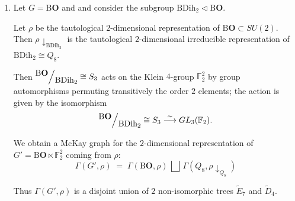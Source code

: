 \documentclass[ALCO]{cedram}
\def\quotient#1#2{
    \raise1ex\hbox{$#1$}\Big/\lower1ex\hbox{$#2$}
}
\begin{document}
\begin{exam}
\begin{enumerate}
 Let $\rho$ be the tautological $2$-dimensional representation of $\mathrm{B}\mathbf{O}\subset SU(2)$. Then $\rho\downarrow_{\mathrm{B}\mathbf{T}}$ is the tautological $2$-dimensional irreducible representation of~$\mathrm{B}\mathbf{T}$.
 
We obtain a McKay graph for the $2$-dimensional representation of $G'=\mathrm{B}\mathbf{O} \ltimes {C_3}$ coming from $\rho$: $$\Gamma(G', \rho) \;=\; \Gamma(\mathrm{B}\mathbf{O}, \rho) \,\bigsqcup \,\Gamma(\mathrm{B}\mathbf{T}, \rho\downarrow_{\mathrm{B}\mathbf{T}})$$
 
 Thus $\Gamma(G',  \rho)$ is a disjoint union of $2$ non-isomorphic trees $\widetilde{E}_7$ and $\widetilde{E}_6$.
   \item Let $G=\mathrm{B}\mathbf{O}$ and 
   and consider the subgroup $\mathrm{BDih}_2 \triangleleft \mathrm{B}\mathbf{O}$.
   
   Let $\rho$ be the {tautological} $2$-dimensional representation of $\mathrm{B}\mathbf{O}\subset SU(2)$. Then $\rho\downarrow_{\mathrm{BDih}_2}$ is the tautological $2$-dimensional irreducible representation of $\mathrm{BDih}_2 \cong Q_8 $.
 
   
  Then $\quotient{\mathrm{B}\mathbf{O}}{\mathrm{BDih}_2}  \cong S_3$ acts on the Klein $4$-group $\mathbb{F}_2^2$ by group automorphisms permuting transitively the order $2$ elements; the action is given by the isomorphism $$\quotient{\mathrm{B}\mathbf{O}}{\mathrm{BDih}_2} \cong S_3 \stackrel{\sim}{\longrightarrow} GL_3(\mathbb{F}_2) .$$

 
 
We obtain a McKay graph for the $2$-dimensional representation of $G'=\mathrm{B}\mathbf{O}\ltimes \mathbb{F}_2^2$ coming from $\rho$: $$\Gamma(G',  \rho) \;=\; \Gamma(\mathrm{B}\mathbf{O}, \rho) \,\bigsqcup\, \Gamma(Q_8, \rho\downarrow_{Q_8})$$
 
 Thus $\Gamma(G',  \rho)$ is a disjoint union of $2$ non-isomorphic trees $\widetilde{E}_7$ and $\widetilde{D}_4$.
\end{enumerate}
 
 
 \end{exam} 



\end{document}

